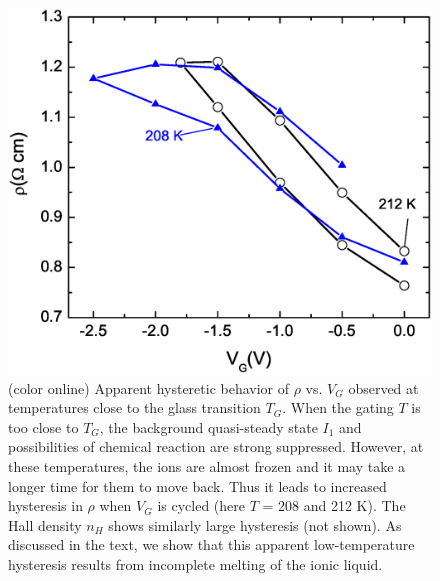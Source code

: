 \begin{figure}[!htbp]
  \begin{center}
\includegraphics[width=0.7\linewidth]{ch-appendicies/figures/FigRvsVGLowT.eps}
\caption{\label{figRLowT} (color online) 
Apparent hysteretic behavior of $\rho$ vs. $V_G$ observed at temperatures close to the glass transition $T_G$. 
When the gating $T$ is too close to $T_G$, the background quasi-steady state $I_1$ and 
possibilities of chemical reaction are strong suppressed. However, at these temperatures, the ions are almost frozen and it may take a longer time for them to move back. Thus it leads to increased hysteresis in $\rho$ when $V_G$ is cycled (here $T$ = 208 and 212 K). The Hall density $n_H$ shows similarly large hysteresis (not shown). 
As discussed in the text, we show that this apparent low-temperature hysteresis results from incomplete
melting of the ionic liquid.
}
  \end{center}
\end{figure} 



